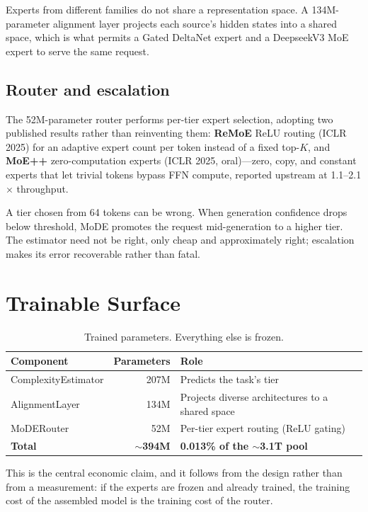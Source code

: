 \documentclass[11pt,a4paper]{article}
\begin{document}
Experts from different families do not share a representation space. A 134M-parameter
alignment layer projects each source's hidden states into a shared space, which is what
permits a Gated DeltaNet expert and a DeepseekV3 MoE expert to serve the same request.

\subsection{Router and escalation}

The 52M-parameter router performs per-tier expert selection, adopting two published
results rather than reinventing them: \textbf{ReMoE} ReLU routing (ICLR 2025) for an
adaptive expert count per token instead of a fixed top-$K$, and \textbf{MoE++}
zero-computation experts (ICLR 2025, oral)---zero, copy, and constant experts that let
trivial tokens bypass FFN compute, reported upstream at 1.1--2.1$\times$ throughput.

A tier chosen from 64 tokens can be wrong. When generation confidence drops below
threshold, MoDE promotes the request mid-generation to a higher tier. The estimator need
not be right, only cheap and approximately right; escalation makes its error recoverable
rather than fatal.

\section{Trainable Surface}

\begin{table}[H]
\centering
\caption{Trained parameters. Everything else is frozen.}
\begin{tabular}{lrl}
\toprule
\textbf{Component} & \textbf{Parameters} & \textbf{Role} \\
\midrule
ComplexityEstimator & 207M & Predicts the task's tier \\
AlignmentLayer      & 134M & Projects diverse architectures to a shared space \\
MoDERouter          & 52M  & Per-tier expert routing (ReLU gating) \\
\midrule
\textbf{Total} & \textbf{$\sim$394M} & \textbf{0.013\% of the $\sim$3.1T pool} \\
\bottomrule
\end{tabular}
\end{table}

This is the central economic claim, and it follows from the design rather than from a
measurement: if the experts are frozen and already trained, the training cost of the
assembled model is the training cost of the router.
\end{document}
